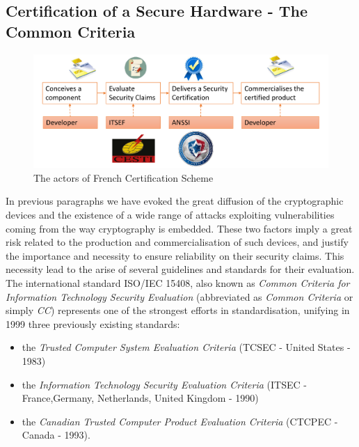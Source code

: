 \subsection{Certification of a Secure Hardware - The Common Criteria}
\begin{figure}
\includegraphics[width=\textwidth]{../Figures/ITSEF_ANSSI2.pdf} 
\caption{The actors of French Certification Scheme}
\end{figure}
In previous paragraphs we have evoked the great diffusion of the cryptographic devices and the existence of a wide range of attacks exploiting vulnerabilities coming from the way cryptography is embedded. These two factors imply a great risk related to the production and commercialisation of such devices, and justify the importance and necessity to ensure reliability on their security claims. This necessity lead to the arise of several guidelines and standards for their evaluation. The international standard ISO/IEC 15408, also known as \emph{Common Criteria for Information Technology Security Evaluation} (abbreviated as \emph{Common Criteria} or simply \emph{CC}) represents one of the strongest efforts in standardisation, unifying in 1999 three previously existing standards:
\begin{itemize}
\item the \emph{Trusted Computer System Evaluation Criteria} (TCSEC - United States - 1983)
\item the \emph{Information Technology Security Evaluation Criteria} (ITSEC - France,Germany, Netherlands, United Kingdom - 1990)
\item the \emph{Canadian Trusted Computer Product Evaluation Criteria} (CTCPEC - Canada - 1993).
\end{itemize}

